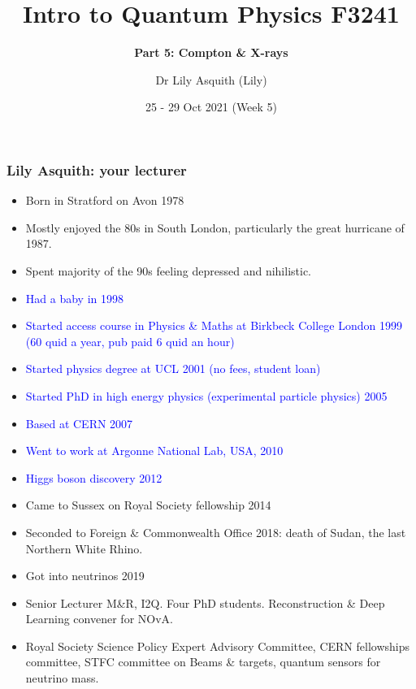 


% 
\title[ Intro to Quantum Physics]{Intro to Quantum Physics F3241}
\subtitle{\textbf{Part 5: Compton \& X-rays}}
\author[Dr Lily Asquith (Lily)]{ Dr Lily Asquith (Lily)}
\date[25 - 29 Oct 2021]{ 25 - 29 Oct 2021 (Week 5)}





\begin{frame}
\frametitle{Lily Asquith: your lecturer} 
\notsotiny
\begin{itemize}
\item Born in Stratford on Avon 1978
\item Mostly enjoyed the 80s in South London, particularly the great hurricane of 1987.
\item Spent majority of the 90s feeling depressed and nihilistic.
\item \textcolor{blue}{Had a baby in 1998}
\item \textcolor{blue}{Started access course in Physics \& Maths at Birkbeck College London 1999 (60 quid a year, pub paid 6 quid an hour)}
\item \textcolor{blue}{Started physics degree at UCL 2001 (no fees, student loan)}
\item \textcolor{blue}{Started PhD in high energy physics (experimental particle physics) 2005}
\item \textcolor{blue}{Based at CERN 2007}
\item \textcolor{blue}{Went to work at Argonne National Lab, USA, 2010}
\item \textcolor{blue}{Higgs boson discovery 2012}
\item Came to Sussex on Royal Society fellowship 2014
\item Seconded to Foreign \& Commonwealth Office 2018: death of Sudan, the last Northern White Rhino.
\item Got into neutrinos 2019
\item Senior Lecturer  M\&R, I2Q. Four PhD students. Reconstruction \& Deep Learning convener for NOvA. 
\item Royal Society Science Policy Expert Advisory Committee, CERN fellowships committee, STFC committee on Beams \& targets, quantum sensors for neutrino mass.
\end{itemize}

\end{frame} 
 














 
